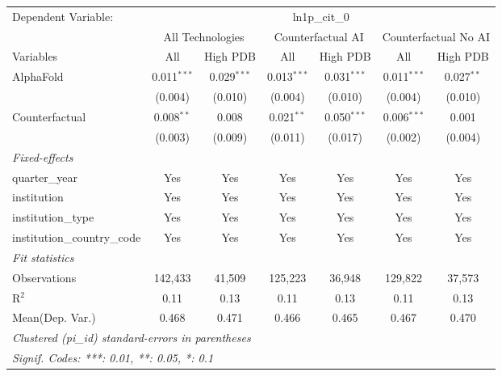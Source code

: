 \begingroup
\centering
\begin{tabular}{lcccccc}
   \tabularnewline \midrule \midrule
   Dependent Variable: & \multicolumn{6}{c}{ln1p\_cit\_0}\\
 & \multicolumn{2}{c}{All Technologies} & \multicolumn{2}{c}{Counterfactual AI} & \multicolumn{2}{c}{Counterfactual No AI} \\
\cmidrule(lr){1-1}\cmidrule(lr){2-3} \cmidrule(lr){4-5} \cmidrule(lr){6-7}
Variables & \multicolumn{1}{c}{All} & \multicolumn{1}{c}{High PDB} & \multicolumn{1}{c}{All} & \multicolumn{1}{c}{High PDB} & \multicolumn{1}{c}{All} & \multicolumn{1}{c}{High PDB} \\
\cmidrule(lr){1-1}\cmidrule(lr){2-2} \cmidrule(lr){3-3} \cmidrule(lr){4-4} \cmidrule(lr){5-5} \cmidrule(lr){6-6} \cmidrule(lr){7-7}
   AlphaFold                    & 0.011$^{***}$ & 0.029$^{***}$ & 0.013$^{***}$ & 0.031$^{***}$ & 0.011$^{***}$ & 0.027$^{**}$\\   
                                & (0.004)       & (0.010)       & (0.004)       & (0.010)       & (0.004)       & (0.010)\\   
   Counterfactual               & 0.008$^{**}$  & 0.008         & 0.021$^{**}$  & 0.050$^{***}$ & 0.006$^{***}$ & 0.001\\   
                                & (0.003)       & (0.009)       & (0.011)       & (0.017)       & (0.002)       & (0.004)\\   
   \midrule
   \emph{Fixed-effects}\\
   quarter\_year                & Yes           & Yes           & Yes           & Yes           & Yes           & Yes\\  
   institution                  & Yes           & Yes           & Yes           & Yes           & Yes           & Yes\\  
   institution\_type            & Yes           & Yes           & Yes           & Yes           & Yes           & Yes\\  
   institution\_country\_code   & Yes           & Yes           & Yes           & Yes           & Yes           & Yes\\  
   \midrule
   \emph{Fit statistics}\\
   Observations                 & 142,433       & 41,509        & 125,223       & 36,948        & 129,822       & 37,573\\  
   R$^2$                        & 0.11          & 0.13          & 0.11          & 0.13          & 0.11          & 0.13\\  
Mean(Dep. Var.) & 0.468 & 0.471 & 0.466 & 0.465 & 0.467 & 0.470 \\
   \midrule \midrule
   \multicolumn{7}{l}{\emph{Clustered (pi\_id) standard-errors in parentheses}}\\
   \multicolumn{7}{l}{\emph{Signif. Codes: ***: 0.01, **: 0.05, *: 0.1}}\\
\end{tabular}
\par\endgroup
